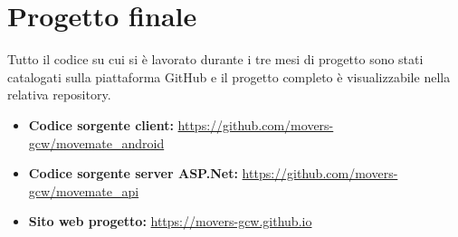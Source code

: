 \section{Progetto finale}
Tutto il codice su cui si è lavorato durante i tre mesi di progetto sono stati catalogati sulla piattaforma GitHub e il progetto completo è visualizzabile nella relativa repository.
\begin{itemize}
\item \textbf{Codice sorgente client:} \url{https://github.com/movers-gcw/movemate_android}
\item \textbf{Codice sorgente server ASP.Net:} \url{https://github.com/movers-gcw/movemate_api}
\item \textbf{Sito web progetto:} \url{https://movers-gcw.github.io}
\end{itemize}
